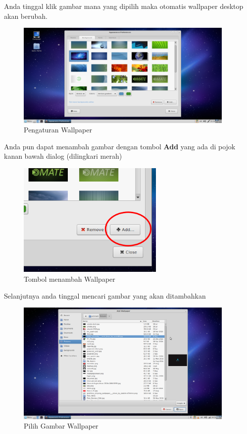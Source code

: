 \documentclass[12pt,]{article}
\begin{document}
	Anda tinggal klik gambar mana yang dipilih maka otomatis wallpaper desktop akan berubah.
	\newpage
	\begin{figure}[!ht]
		\centering
		\includegraphics[width=300pt]{png/wallpaperdlg2}
		\caption{Pengaturan Wallpaper}
	\end{figure}

	Anda pun dapat menambah gambar dengan tombol \textbf{Add} yang ada di pojok kanan bawah dialog (dilingkari merah)
	
	\begin{figure}[!ht]
		\centering
		\includegraphics[width=200pt]{png/wallpaperadd}
		\caption{Tombol menambah Wallpaper}
	\end{figure}   

	Selanjutnya anda tinggal mencari gambar yang akan ditambahkan
	
	\begin{figure}[!ht]
		\centering
		\includegraphics[width=300pt]{png/wallpaperadd2}
		\caption{Pilih Gambar Wallpaper}
	\end{figure}
\end{document}
